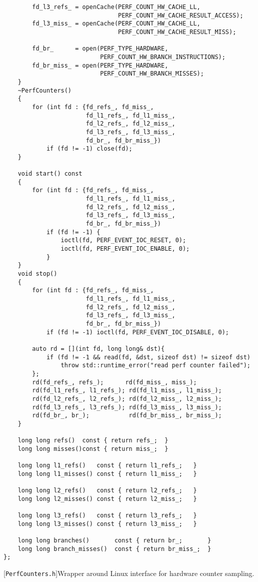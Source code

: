 \begin{lstlisting}
        fd_l3_refs_ = openCache(PERF_COUNT_HW_CACHE_LL,
                                PERF_COUNT_HW_CACHE_RESULT_ACCESS);
        fd_l3_miss_ = openCache(PERF_COUNT_HW_CACHE_LL,
                                PERF_COUNT_HW_CACHE_RESULT_MISS);

        fd_br_      = open(PERF_TYPE_HARDWARE,
                           PERF_COUNT_HW_BRANCH_INSTRUCTIONS);
        fd_br_miss_ = open(PERF_TYPE_HARDWARE,
                           PERF_COUNT_HW_BRANCH_MISSES);
    }
    ~PerfCounters()
    {
        for (int fd : {fd_refs_, fd_miss_,
                       fd_l1_refs_, fd_l1_miss_,
                       fd_l2_refs_, fd_l2_miss_,
                       fd_l3_refs_, fd_l3_miss_,
                       fd_br_, fd_br_miss_})
            if (fd != -1) close(fd);
    }

    void start() const
    {
        for (int fd : {fd_refs_, fd_miss_,
                       fd_l1_refs_, fd_l1_miss_,
                       fd_l2_refs_, fd_l2_miss_,
                       fd_l3_refs_, fd_l3_miss_,
                       fd_br_, fd_br_miss_})
            if (fd != -1) {
                ioctl(fd, PERF_EVENT_IOC_RESET, 0);
                ioctl(fd, PERF_EVENT_IOC_ENABLE, 0);
            }
    }
    void stop()
    {
        for (int fd : {fd_refs_, fd_miss_,
                       fd_l1_refs_, fd_l1_miss_,
                       fd_l2_refs_, fd_l2_miss_,
                       fd_l3_refs_, fd_l3_miss_,
                       fd_br_, fd_br_miss_})
            if (fd != -1) ioctl(fd, PERF_EVENT_IOC_DISABLE, 0);

        auto rd = [](int fd, long long& dst){
            if (fd != -1 && read(fd, &dst, sizeof dst) != sizeof dst)
                throw std::runtime_error("read perf counter failed");
        };
        rd(fd_refs_, refs_);      rd(fd_miss_, miss_);
        rd(fd_l1_refs_, l1_refs_); rd(fd_l1_miss_, l1_miss_);
        rd(fd_l2_refs_, l2_refs_); rd(fd_l2_miss_, l2_miss_);
        rd(fd_l3_refs_, l3_refs_); rd(fd_l3_miss_, l3_miss_);
        rd(fd_br_, br_);           rd(fd_br_miss_, br_miss_);
    }

    long long refs()  const { return refs_;  }
    long long misses()const { return miss_;  }

    long long l1_refs()   const { return l1_refs_;   }
    long long l1_misses() const { return l1_miss_;   }

    long long l2_refs()   const { return l2_refs_;   }
    long long l2_misses() const { return l2_miss_;   }

    long long l3_refs()   const { return l3_refs_;   }
    long long l3_misses() const { return l3_miss_;   }

    long long branches()       const { return br_;       }
    long long branch_misses()  const { return br_miss_;  }
};
\end{lstlisting}
[\texttt{PerfCounters.h}]{Wrapper around Linux
interface for hardware counter sampling.}
\label{lst:perfcounters-h}


